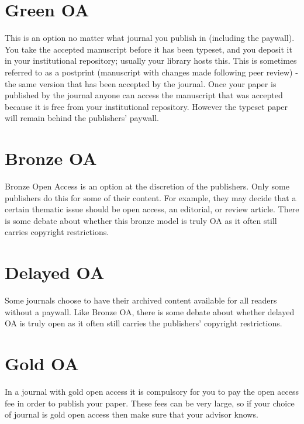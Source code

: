 \documentclass[
]{krantz}
\begin{document}
\hypertarget{green-oa}{%
\section{Green OA}\label{green-oa}}

This is an option no matter what journal you publish in (including the paywall). You take the accepted manuscript before it has been typeset, and you deposit it in your institutional repository; usually your library hosts this. This is sometimes referred to as a postprint (manuscript with changes made following peer review) - the same version that has been accepted by the journal. Once your paper is published by the journal anyone can access the manuscript that was accepted because it is free from your institutional repository. However the typeset paper will remain behind the publishers' paywall.

\hypertarget{bronze-oa}{%
\section{Bronze OA}\label{bronze-oa}}

Bronze Open Access is an option at the discretion of the publishers. Only some publishers do this for some of their content. For example, they may decide that a certain thematic issue should be open access, an editorial, or review article. There is some debate about whether this bronze model is truly OA as it often still carries copyright restrictions.

\hypertarget{delayed-oa}{%
\section{Delayed OA}\label{delayed-oa}}

Some journals choose to have their archived content available for all readers without a paywall. Like Bronze OA, there is some debate about whether delayed OA is truly open as it often still carries the publishers' copyright restrictions.

\hypertarget{gold-oa}{%
\section{Gold OA}\label{gold-oa}}

In a journal with gold open access it is compulsory for you to pay the open access fee in order to publish your paper. These fees can be very large, so if your choice of journal is gold open access then make sure that your advisor knows.
\end{document}
